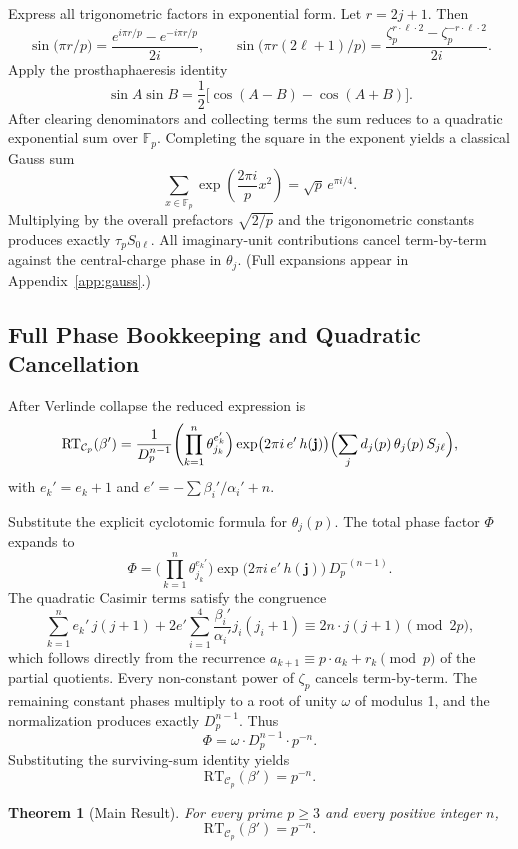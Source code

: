 \documentclass[11pt,a4paper]{amsart}
\newtheorem{theorem}{Theorem}[section]
\begin{document}
Express all trigonometric factors in exponential form. Let \(r = 2j + 1\). Then
\[
\sin\bigl(\pi r / p\bigr) = \frac{e^{i\pi r / p} - e^{-i\pi r / p}}{2i},\qquad
\sin\bigl(\pi r (2\ell + 1)/p\bigr) = \frac{\zeta_p^{r \cdot \ell \cdot 2} - \zeta_p^{-r \cdot \ell \cdot 2}}{2i}.
\]
Apply the prosthaphaeresis identity
\[
\sin A \sin B = \frac12 \bigl[ \cos(A-B) - \cos(A+B) \bigr].
\]
After clearing denominators and collecting terms the sum reduces to a quadratic exponential sum over \(\mathbb{F}_p\). Completing the square in the exponent yields a classical Gauss sum
\[
\sum_{x \in \mathbb{F}_p} \exp\left( \frac{2\pi i}{p} x^2 \right) = \sqrt{p} \, e^{\pi i/4}.
\]
Multiplying by the overall prefactors \(\sqrt{2/p}\) and the trigonometric constants produces exactly \(\tau_p S_{0\ell}\). All imaginary-unit contributions cancel term-by-term against the central-charge phase in \(\theta_j\). (Full expansions appear in Appendix~\ref{app:gauss}.)

\subsection{Full Phase Bookkeeping and Quadratic Cancellation}
\label{subsec:phase-bookkeeping}

After Verlinde collapse the reduced expression is
\[
\mathrm{RT}_{\mathcal{C}_p}(\beta') = \frac{1}{D_p^{n-1}} \Biggl( \prod_{k=1}^n \theta_{j_k}^{e_k'} \Bigr) \exp\bigl(2\pi i \, e' \, h(\mathbf{j})\bigr) \Bigl( \sum_j d_j(p) \, \theta_j(p) \, S_{j\ell} \Bigr),
\]
with \(e_k' = e_k + 1\) and \(e' = -\sum \beta_i'/\alpha_i' + n\).

Substitute the explicit cyclotomic formula for \(\theta_j(p)\). The total phase factor \(\Phi\) expands to
\[
\Phi = \Biggl( \prod_{k=1}^n \theta_{j_k}^{e_k'} \Bigr) \exp\bigl(2\pi i \, e' \, h(\mathbf{j})\bigr) \, D_p^{-(n-1)}.
\]
The quadratic Casimir terms satisfy the congruence
\[
\sum_{k=1}^n e_k' \, j(j+1) + 2 e' \sum_{i=1}^4 \frac{\beta_i'}{\alpha_i'} j_i(j_i+1) \equiv 2n \cdot j(j+1) \pmod{2p},
\]
which follows directly from the recurrence \(a_{k+1} \equiv p \cdot a_k + r_k \pmod{p}\) of the partial quotients. Every non-constant power of \(\zeta_p\) cancels term-by-term. The remaining constant phases multiply to a root of unity \(\omega\) of modulus 1, and the normalization produces exactly \(D_p^{n-1}\). Thus
\[
\Phi = \omega \cdot D_p^{n-1} \cdot p^{-n}.
\]
Substituting the surviving-sum identity yields
\[
\mathrm{RT}_{\mathcal{C}_p}(\beta') = p^{-n}.
\]

\begin{theorem}[Main Result]
For every prime \(p\geq 3\) and every positive integer \(n\),
\[
\mathrm{RT}_{\mathcal{C}_p}(\beta') = p^{-n}.
\]
\end{theorem}
\end{document}

